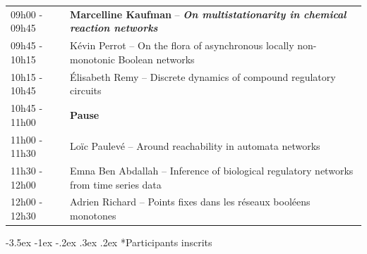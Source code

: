 \documentclass[10pt, a4paper]{article}
\makeatletter
\renewcommand{\section}{\@startsection {section}{1}{\z@}%
             {-3.5ex \@plus -1ex \@minus -.2ex}%
             {.3ex \@plus.2ex}%
             {\centering\normalfont\large\bfseries}}
\makeatother
\begin{document}
\begin{tabular}{p{}p{}}
	09h00 - 09h45 & \textbf{Marcelline Kaufman} -- \emph{\textbf{On multistationarity in 
		chemical reaction networks}}\\[2mm]
	09h45 - 10h15 & Kévin Perrot -- On the flora of asynchronous locally non-monotonic 
		Boolean networks\\[1mm]
	10h15 - 10h45 & Élisabeth Remy -- Discrete dynamics of compound regulatory 
		circuits\\[2mm]
	10h45 - 11h00 & \textbf{Pause}\\[2mm]
	11h00 - 11h30 & Loïc Paulevé -- Around reachability in automata networks\\[1mm]
	11h30 - 12h00 & Emna Ben Abdallah -- Inference of biological regulatory networks from 
		time series data\\[1mm]
	12h00 - 12h30 & Adrien Richard -- Points fixes dans les réseaux booléens monotones
\end{tabular}

\pagebreak

\vspace*{4mm}\section*{Participants inscrits}\medskip\medskip
\end{document}
